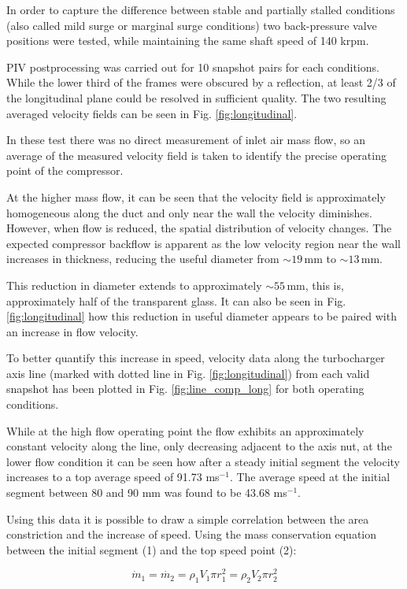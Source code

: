 In order to capture the difference between stable and partially stalled conditions (also called mild surge or marginal surge conditions) two back-pressure valve positions were tested, while maintaining the same shaft speed of 140 krpm.

PIV postprocessing was carried out for 10 snapshot pairs for each conditions. While the lower third of the frames were obscured by a reflection, at least 2/3 of the longitudinal plane could be resolved in sufficient quality. The two resulting averaged velocity fields can be seen in Fig. \ref{fig:longitudinal}.

In these test there was no direct measurement of inlet air mass flow, so an average of the measured velocity field is taken to identify the precise operating point of the compressor.

At the higher mass flow, it can be seen that the velocity field is approximately homogeneous along the duct and only near the wall the velocity diminishes. However, when flow is reduced, the spatial distribution of velocity changes. The expected compressor backflow is apparent as the low velocity region near the wall increases in thickness, reducing the useful diameter from $\sim 19\,$mm to $\sim 13\,$mm.

This reduction in diameter extends to approximately $\sim 55\,$mm, this is, approximately half of the transparent glass. It can also be seen in Fig. \ref{fig:longitudinal} how this reduction in useful diameter appears to be paired with an increase in flow velocity. 

To better quantify this increase in speed, velocity data along the turbocharger axis line (marked with dotted line in Fig. \ref{fig:longitudinal}) from each valid snapshot has been plotted in Fig. \ref{fig:line_comp_long} for both operating conditions. 

While at the high flow operating point the flow exhibits an approximately constant velocity along the line, only decreasing adjacent to the axis nut, at the lower flow condition it can be seen how after a steady initial segment the velocity increases to a top average speed of 91.73 ms${}^{-1}$. The average speed at the initial segment between 80 and 90 mm was found to be 43.68 ms${}^{-1}$.

Using this data it is possible to draw a simple correlation between the area constriction and the increase of speed. Using the mass conservation equation between the initial segment (1) and the top speed point (2):

\begin{equation}
  \dot{m}_1 = \dot{m_2} = \rho_1 V_1 \pi r_1^2 = \rho_2 V_2 \pi r_2^2
\end{equation}

